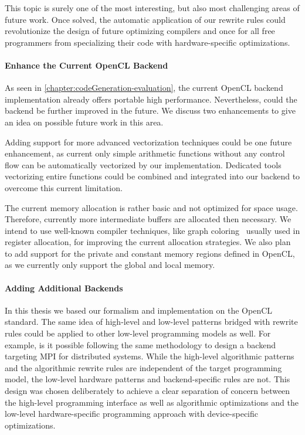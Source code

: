 \bigskip
This topic is surely one of the most interesting, but also most challenging areas of future work.
Once solved, the automatic application of our rewrite rules could revolutionize the design of future optimizing compilers and once for all free programmers from specializing their code with hardware-specific optimizations.

\paragraph{Enhance the Current OpenCL Backend}
As seen in \autoref{chapter:codeGeneration-evaluation}, the current OpenCL backend implementation already offers portable high performance.
Nevertheless, could the backend be further improved in the future.
We discuss two enhancements to give an idea on possible future work in this area.

Adding support for more advanced vectorization techniques could be one future enhancement, as current only simple arithmetic functions without any control flow can be automatically vectorized by our implementation.
Dedicated tools vectorizing entire functions could be combined and integrated into our backend to overcome this current limitation.

The current memory allocation is rather basic and not optimized for space usage.
Therefore, currently more intermediate buffers are allocated then necessary.
We intend to use well-known compiler techniques, like graph coloring~\cite{} usually used in register allocation, for improving the current allocation strategies.
We also plan to add support for the private and constant memory regions defined in OpenCL, as we currently only support the global and local memory.

\paragraph{Adding Additional Backends}
In this thesis we based our formalism and implementation on the OpenCL standard.
The same idea of high-level and low-level patterns bridged with rewrite rules could be applied to other low-level programming models as well.
For example, is it possible following the same methodology to design a backend targeting MPI for distributed systems.
While the high-level algorithmic patterns and the algorithmic rewrite rules are independent of the target programming model, the low-level hardware patterns and  backend-specific rules are not.
This design was chosen deliberately to achieve a clear separation of concern between the high-level programming interface as well as algorithmic optimizations and the low-level hardware-specific programming approach with device-specific optimizations.


